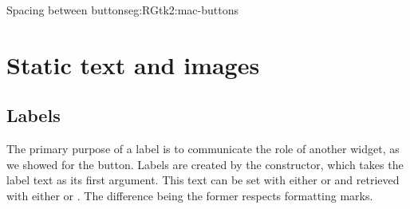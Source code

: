 \begin{example}{Spacing between buttons}{eg:RGtk2:mac-buttons}
\end{example}

\section{Static text and images}

\subsection{Labels}
\label{sec:RGtk2:gtkLabel}

The primary purpose of a label is to communicate the role of another
widget, as we showed for the button. Labels are created by the
 constructor, which takes the label text as its
first argument. This text can be set with either
 or  and
retrieved with either  or
.  The difference being the former
respects formatting marks.

